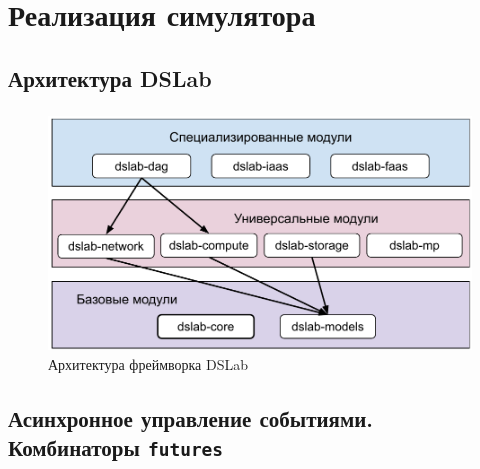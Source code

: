 \documentclass[t]{beamer}  %
\begin{document}
	\section{Реализация симулятора}

	\subsection{Архитектура DSLab}
	\begin{frame}[fragile]
		\frametitle{\insertsection} 
		\framesubtitle{\insertsubsection}
		\vspace{0.5cm}
		\begin{figure}[H]
			\centering
			\includegraphics[width=\linewidth]{images/dslab_arc}
			\caption*{Архитектура фреймворка DSLab}
		\end{figure}
	\end{frame}


	\subsection{Асинхронное управление событиями. Комбинаторы \texttt{futures}}
\end{document}
